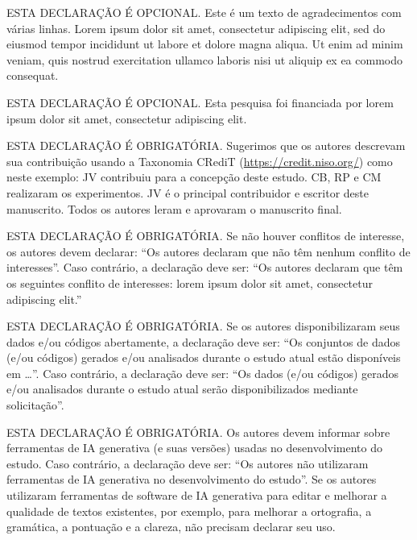 \documentclass[portuguese]{sbc2025}%
\begin{document}
\begin{declarations}

\begin{acknowledgements}
ESTA DECLARAÇÃO É OPCIONAL. Este é um texto de agradecimentos com várias linhas. Lorem ipsum dolor sit amet, consectetur adipiscing elit, sed do eiusmod tempor incididunt ut labore et dolore magna aliqua. Ut enim ad minim veniam, quis nostrud exercitation ullamco laboris nisi ut aliquip ex ea commodo consequat.
\end{acknowledgements}

\begin{funding}
ESTA DECLARAÇÃO É OPCIONAL. Esta pesquisa foi financiada por lorem ipsum dolor sit amet, consectetur adipiscing elit.
\end{funding}

\begin{contributions}
ESTA DECLARAÇÃO É OBRIGATÓRIA. Sugerimos que os autores descrevam sua contribuição usando a Taxonomia CRediT (\href{https://credit.niso.org/}{https://credit.niso.org/}) como neste exemplo: JV contribuiu para a concepção deste estudo. CB, RP e CM realizaram os experimentos. JV é o principal contribuidor e escritor deste manuscrito. Todos os autores leram e aprovaram o manuscrito final. 
\end{contributions}

\begin{interests}
ESTA DECLARAÇÃO É OBRIGATÓRIA. Se não houver conflitos de interesse, os autores devem declarar: ``Os autores declaram que não têm nenhum conflito de interesses''. Caso contrário, a declaração deve ser: ``Os autores declaram que têm os seguintes conflito de interesses: lorem ipsum dolor sit amet, consectetur adipiscing elit.''
\end{interests}

\begin{materials}
ESTA DECLARAÇÃO É OBRIGATÓRIA. 
Se os autores disponibilizaram seus dados e/ou códigos abertamente, a declaração deve ser: 
``Os conjuntos de dados (e/ou códigos) gerados e/ou analisados durante o estudo atual estão disponíveis em \ldots''. 
Caso contrário, a declaração deve ser: 
``Os dados (e/ou códigos) gerados e/ou analisados durante o estudo atual serão disponibilizados mediante solicitação''. 
\end{materials}

\begin{aitools}
ESTA DECLARAÇÃO É OBRIGATÓRIA.  
Os autores devem informar sobre ferramentas de IA generativa (e suas versões) usadas no desenvolvimento do estudo. 
Caso contrário, a declaração deve ser: 
``Os autores não utilizaram ferramentas de IA generativa no desenvolvimento do estudo''.
%
Se os autores utilizaram ferramentas de software de IA generativa para editar e melhorar a qualidade de textos existentes, por exemplo, para melhorar a ortografia, a gramática, a pontuação e a clareza, não precisam declarar seu uso.
\end{aitools}


\end{declarations}
\end{document}
